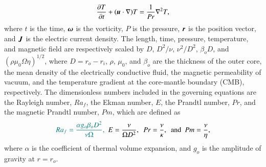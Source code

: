 %
\begin{equation}
\frac{\partial T}{\partial t} 
 + ( \mbox{\boldmath$u$} \cdot \nabla ) T =
 \frac{1}{Pr} \nabla^2 T ,
\label{eq:heat}
\end{equation}
%
where $t$ is the time, $\mbox{\boldmath$\omega$}$ is the vorticity, $P$ is the pressure, $\mbox{\boldmath$r$}$ is the position vector, and $\mbox{\boldmath$J$}$ is the electric current density.
The length, time, pressure, temperature, and magnetic field are respectively scaled by $D$, $D^2/\nu$, $\nu^2 /D^2$, $\beta_o D$, and $(\rho \mu_0 \Omega \eta )^{1/2}$,
where $D = r_o - r_i$, $\rho$, $\mu_0$, and $\beta_o$ are the thickness of the outer core, the mean density of the {\color{teal}electrically} conductive fluid, the magnetic permeability of vacuum, and the temperature gradient at the core-mantle boundary (CMB), respectively.
The dimensionless numbers included in the governing equations are the Rayleigh number, $Ra_f$, the Ekman number, $E$, the Prandtl number, $Pr$, and the magnetic Prandtl number, $Pm$, which are defined as
%
\begin{equation}
{\color{teal}Ra_f = \frac{\alpha g_o \beta_o D^{2}}{\nu \Omega},}~~
E = \frac{\nu}{\Omega D^2},~~
Pr = \frac{\nu}{\kappa},~~ \mbox{and \ }
Pm = \frac{\nu}{\eta},
\label{eq:dimensionless_numbers}
\end{equation}
%
where $\alpha$ is the coefficient of thermal volume expansion, and $g_o$ is the amplitude of gravity at $r = r_o$.

